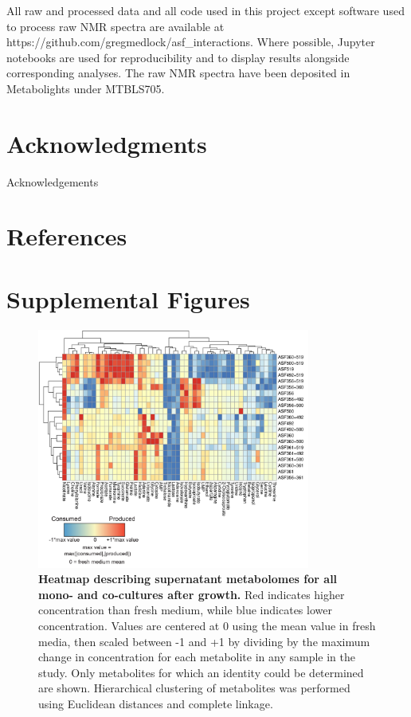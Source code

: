 \documentclass[11pt,twocolumn,notitlepage,openany,twoside]{book}
\begin{document}
\begin{refsection}
All raw and processed data and all code used in this project except software used to process raw NMR spectra are available at https://github.com/gregmedlock/asf_interactions. Where possible, Jupyter notebooks \cite{Kluyver2016-pl} are used for reproducibility and to display results alongside corresponding analyses. The raw NMR spectra have been deposited in Metabolights under MTBLS705.

\section{Acknowledgments}

Acknowledgements


\section{References}
\printbibliography[heading=none]

\section{Supplemental Figures}

\begin{figure}
\centering
\includegraphics[width=0.8\textwidth]{ch2_figS1}
\caption[Heatmap describing supernatant metabolomes for all mono- and co-cultures after growth.]{\textbf{Heatmap describing supernatant metabolomes for all mono- and co-cultures after growth.} Red indicates higher concentration than fresh medium, while blue indicates lower concentration. Values are centered at 0 using the mean value in fresh media, then scaled between -1 and +1 by dividing by the maximum change in concentration for each metabolite in any sample in the study. Only metabolites for which an identity could be determined are shown. Hierarchical clustering of metabolites was performed using Euclidean distances and complete linkage.}
\end{figure}


\end{refsection}
\end{document}
